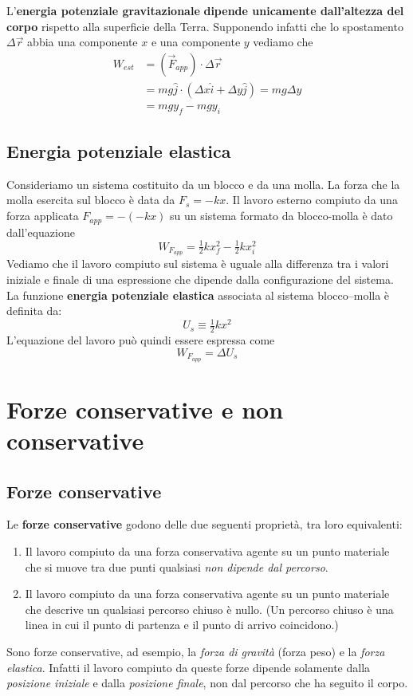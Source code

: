 \documentclass[a4paper,11pt,oneside]{book}
\begin{document}
L’\textbf{energia potenziale gravitazionale} \textbf{dipende unicamente dall’}\textbf{altezza del corpo} rispetto alla superficie della Terra. Supponendo infatti che lo spostamento $\Delta \vec{r}$
abbia una componente $x$ e una componente $y$ vediamo che 
\begin{align*}
    W_{est} &= (\vec{F}_{app})\cdot \Delta \vec{r} \\
    &= mg\hat{j} \cdot (\Delta x \hat{i} + \Delta y \hat{j}) = mg\Delta y \\ 
    &= mgy_f - mgy_i
\end{align*}

\subsection{Energia potenziale elastica}
Consideriamo un sistema costituito da un blocco e da una molla. La forza che la molla esercita sul blocco è data da $F_s = -kx$.
Il lavoro esterno compiuto da una forza applicata $F_{app}=-(-kx)$ su un sistema formato da blocco-molla è dato dall'equazione
\begin{equation*}
    W_{F_{app}} = \tfrac{1}{2} kx_f^2 -\tfrac{1}{2} kx_i^2
\end{equation*}
Vediamo che il lavoro compiuto sul sistema è uguale alla differenza tra i valori iniziale e finale di una espressione che dipende dalla configurazione del sistema.
La funzione \textbf{energia potenziale elastica} associata al sistema blocco–molla è definita da:
\begin{equation*}
    U_s \equiv  \tfrac{1}{2}kx^2
\end{equation*}
L'equazione del lavoro può quindi essere espressa come
\begin{equation*}
    W_{F_{app}} = \Delta U_s
\end{equation*}


\section{Forze conservative e non conservative}

\subsection{Forze conservative}
Le \textbf{forze conservative} godono delle due seguenti proprietà, tra loro equivalenti:
\begin{enumerate}
    \item Il lavoro compiuto da una forza conservativa agente su un punto materiale che si muove tra due punti qualsiasi \emph{non dipende dal percorso}.
    \item Il lavoro compiuto da una forza conservativa agente su un punto materiale che descrive un qualsiasi percorso chiuso è nullo. (Un percorso chiuso è una linea in cui il punto di partenza e il punto di arrivo coincidono.)
\end{enumerate}
Sono forze conservative, ad esempio, la \emph{forza di gravità} (forza peso) e la \emph{forza elastica}. Infatti il lavoro compiuto da queste forze dipende solamente dalla \emph{posizione iniziale} e dalla \emph{posizione finale}, 
non dal percorso che ha seguito il corpo.
\end{document}
